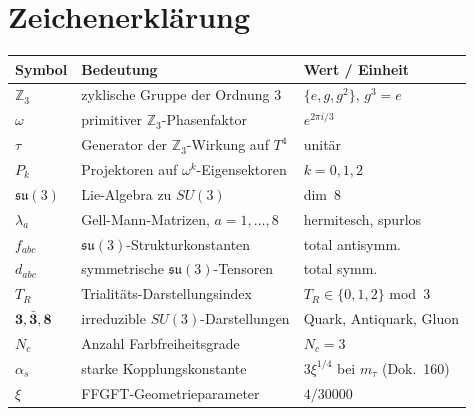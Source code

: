 %

\section*{Zeichenerklärung}

\begin{center}
\begin{tabular}{lll}
\toprule
Symbol & Bedeutung & Wert / Einheit \\
\midrule
$\mathbb{Z}_3$ & zyklische Gruppe der Ordnung 3 & $\{e,g,g^2\}$, $g^3=e$ \\
$\omega$ & primitiver $\mathbb{Z}_3$-Phasenfaktor & $e^{2\pi i/3}$ \\
$\tau$ & Generator der $\mathbb{Z}_3$-Wirkung auf $T^4$ & unitär \\
$P_k$ & Projektoren auf $\omega^k$-Eigensektoren & $k=0,1,2$ \\
$\mathfrak{su}(3)$ & Lie-Algebra zu $SU(3)$ & dim~8 \\
$\lambda_a$ & Gell-Mann-Matrizen, $a=1,\ldots,8$ & hermitesch, spurlos \\
$f_{abc}$ & $\mathfrak{su}(3)$-Strukturkonstanten & total antisymm. \\
$d_{abc}$ & symmetrische $\mathfrak{su}(3)$-Tensoren & total symm. \\
$T_R$ & Trialitäts-Darstellungsindex & $T_R \in \{0,1,2\}$ mod~3 \\
$\mathbf{3}, \bar{\mathbf{3}}, \mathbf{8}$ & irreduzible $SU(3)$-Darstellungen & Quark, Antiquark, Gluon \\
$N_c$ & Anzahl Farbfreiheitsgrade & $N_c = 3$ \\
$\alpha_s$ & starke Kopplungskonstante & $3\xi^{1/4}$ bei $m_\tau$ (Dok.~160) \\
$\xi$ & FFGFT-Geometrieparameter & $4/30000$ \\
\bottomrule
\end{tabular}
\end{center}

